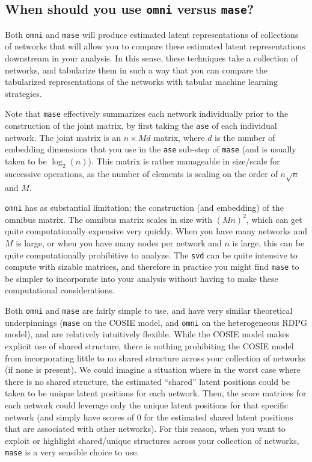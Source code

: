 \subsection{When should you use \texttt{omni} versus \texttt{mase}?}

Both \texttt{omni} and \texttt{mase} will produce estimated latent representations of collections of networks that will allow you to compare these estimated latent representations downstream in your analysis. In this sense, these techniques take a collection of networks, and tabularize them in such a way that you can compare the tabularized representations of the networks with tabular machine learning strategies. 

Note that \texttt{mase} effectively summarizes each network individually prior to the construction of the joint matrix, by first taking the \texttt{ase} of each individual network. The joint matrix is an $n \times Md$ matrix, where $d$ is the number of embedding dimensions that you use in the \texttt{ase} sub-step of \texttt{mase} (and is usually taken to be $\log_2(n)$). This matrix is rather manageable in size/scale for successive operations, as the number of elements is scaling on the order of $n\sqrt n$ and $M$.

\texttt{omni} has as substantial limitation: the construction (and embedding) of the omnibus matrix. The omnibus matrix scales in size with $(Mn)^2$, which can get quite computationally expensive very quickly. When you have many networks and $M$ is large, or when you have many nodes per network and $n$ is large, this can be quite computationally prohibitive to analyze. The \texttt{svd} can be quite intensive to compute with sizable matrices, and therefore in practice you might find \texttt{mase} to be simpler to incorporate into your analysis without having to make these computational considerations.

Both \texttt{omni} and \texttt{mase} are fairly simple to use, and have very similar theoretical underpinnings (\texttt{mase} on the COSIE model, and \texttt{omni} on the heterogeneous RDPG model), and are relatively intuitively flexible. While the COSIE model makes explicit use of shared structure, there is nothing prohibiting the COSIE model from incorporating little to no shared structure across your collection of networks (if none is present). We could imagine a situation where in the worst case where there is no shared structure, the estimated ``shared'' latent positions could be taken to be unique latent positions for each network. Then, the score matrices for each network could leverage only the unique latent positions for that specific network (and simply have scores of $0$ for the estimated shared latent positions that are associated with other networks). For this reason, when you want to exploit or highlight shared/unique structures across your collection of networks, \texttt{mase} is a very sensible choice to use.

